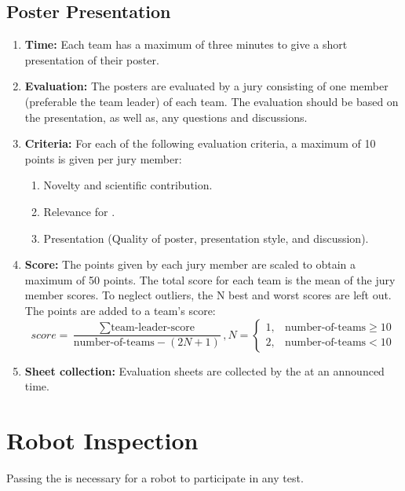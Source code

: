 \subsection{Poster Presentation}
\label{sec:setupdays:posterpresentation}
\begin{enumerate}
	\item \textbf{Time:} Each team has a maximum of three minutes to give a short presentation of their poster.
	\item \textbf{Evaluation:} The posters are evaluated by a jury consisting of one member (preferable the team leader) of each team. The evaluation should be based on the presentation, as well as, any questions and discussions.
	\item \textbf{Criteria:} For each of the following evaluation criteria, a maximum of 10 points is given per jury member:
	\begin{enumerate}
		\item Novelty and scientific contribution.
		\item Relevance for \RoboCup\AtHome{}.
		\item Presentation (Quality of poster, presentation style, and discussion).
	\end{enumerate}
	\item \textbf{Score:} The points given by each jury member are scaled to obtain a maximum of 50 points. The total score for each team is the mean of the jury member scores. To neglect outliers, the N best and worst scores are left out. The points are added to a team's \SONE{} score:
	$$
	score=\frac{\sum \text{team-leader-score}}{\text{number-of-teams}-\left ( 2N+1  \right )},N=\left\{\begin{matrix}
	1, & \text{number-of-teams} \geq 10\\
	2, & \text{number-of-teams} < 10
	\end{matrix}\right.
	$$
	\item \textbf{Sheet collection:} Evaluation sheets are collected by the \OC{} at an announced time.
\end{enumerate}

\section{Robot Inspection}
\label{sec:setupdays:inspection}
Passing the \RobotInspection{} is necessary for a robot to participate in any test.

